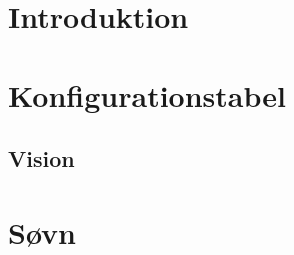 %
%
%
%
% 



\pagestyle{empty} %
%
%

\cleardoublepage

%

\renewcommand{\contentsname}{Indholdsfortegnelse}
\pagestyle{fancy} %
\setcounter{tocdepth}{1}
\tableofcontents
\listoftodos
%
\cleardoublepage

\chapter{Introduktion}


\chapter{Konfigurationstabel}
\section{Vision}


\chapter{Søvn}

